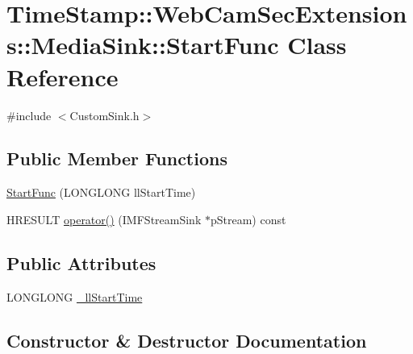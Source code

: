 \hypertarget{class_time_stamp_1_1_web_cam_sec_extensions_1_1_media_sink_1_1_start_func}{}\section{Time\+Stamp\+:\+:Web\+Cam\+Sec\+Extensions\+:\+:Media\+Sink\+:\+:Start\+Func Class Reference}
\label{class_time_stamp_1_1_web_cam_sec_extensions_1_1_media_sink_1_1_start_func}


{\ttfamily \#include $<$Custom\+Sink.\+h$>$}

\subsection*{Public Member Functions}
\begin{DoxyCompactItemize}
\item 
\hyperlink{class_time_stamp_1_1_web_cam_sec_extensions_1_1_media_sink_1_1_start_func_a9efc46779b6a77c608f3e30eac320226}{Start\+Func} (L\+O\+N\+G\+L\+O\+NG ll\+Start\+Time)
\item 
H\+R\+E\+S\+U\+LT \hyperlink{class_time_stamp_1_1_web_cam_sec_extensions_1_1_media_sink_1_1_start_func_a72a150d29625f921a3ead0a261b24515}{operator()} (I\+M\+F\+Stream\+Sink $\ast$p\+Stream) const
\end{DoxyCompactItemize}
\subsection*{Public Attributes}
\begin{DoxyCompactItemize}
\item 
L\+O\+N\+G\+L\+O\+NG \hyperlink{class_time_stamp_1_1_web_cam_sec_extensions_1_1_media_sink_1_1_start_func_a73ba8c8f76c93628febb2fed312dbaae}{\+\_\+ll\+Start\+Time}
\end{DoxyCompactItemize}


\subsection{Constructor \& Destructor Documentation}
\mbox{\label{class_time_stamp_1_1_web_cam_sec_extensions_1_1_media_sink_1_1_start_func_a9efc46779b6a77c608f3e30eac320226}} 
